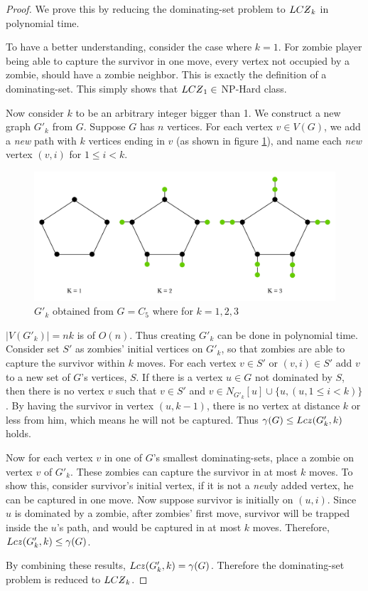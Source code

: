 \documentclass[1p]{elsarticle}
\newcommand{\NPZ}{\ooalign{$Z$\cr\hfil\rule[.8ex]{.3em}{.09ex}\hfil\cr}}
\newcommand{\zn}{\ooalign{$z$\cr\hfil\rule[.5ex]{.2em}{.08ex}\hfil\cr}}
\begin{document}
	\begin{proof}
		We prove this by reducing the dominating-set problem to $LC\NPZ_k$ in polynomial time.

		To have a better understanding, consider the case where $k=1$. For zombie player being able to capture the
		survivor in one move, every vertex not occupied by a zombie, should have a zombie neighbor. This is exactly the
		definition of a dominating-set. This simply shows that $LC\NPZ_1 \in$ NP-Hard class.

		Now consider $k$ to be an arbitrary integer bigger than 1. We construct a new graph $G'_k$ from $G$. Suppose $G$
		has $n$ vertices. For each vertex $v \in V(G)$, we add a {\it new} path with $k$ vertices ending in $v$ (as
		shown in figure \ref{fig:p7}), and name each {\it new} vertex $(v,i)$ for $1 \leq i < k$. 

		\begin{figure}[h!]
			\centering
			\includegraphics[width=0.9\linewidth]{LCZ.png}
			\caption{$G'_k$ obtained from $G = C_5$ where for $k = 1,2,3$}
			\label{fig:p7}
		\end{figure}		


		$|V(G'_k)| = nk$ is of $O(n)$. Thus creating $G'_k$ can be done in polynomial time. Consider set $S'$ as zombies'
		initial vertices on $G'_k$, so that zombies are able to capture the survivor within $k$ moves. For each vertex $v \in
		S'$ or $(v,i) \in S'$ add $v$ to a new set of $G$'s vertices, $S$. If there is a vertex $u \in G$ not dominated by
		$S$, then there is no vertex $v$ such that $v \in S'$ and $v \in N_{G'_k}[u] \cup \{u, (u,1 \leq i < k)\}$. By having
		the survivor in vertex $(u, k-1)$, there is no vertex at distance $k$ or less from him, which means he will not
		be captured. Thus $\gamma(G) \leq Lc\zn(G'_k,k)$ holds.
		
		Now for each vertex $v$ in one of $G$'s smallest dominating-sets, place a zombie on vertex $v$ of $G'_k$. These
		zombies can capture the survivor in at most $k$ moves. To show this, consider survivor's initial vertex, if it
		is not a {\it new}ly added vertex, he can be captured in one move. Now suppose survivor is initially on $(u,i)$. Since
		$u$ is dominated by a zombie, after zombies' first move, survivor will be trapped inside the $u$'s path, and would
		be captured in at most $k$ moves. Therefore, $Lc\zn(G'_k,k) \leq \gamma(G)$.

		By combining these results, $Lc\zn(G'_k,k) = \gamma(G)$. Therefore the dominating-set problem is reduced to
		$LC\NPZ_k$.

	\end{proof}
\end{document}

